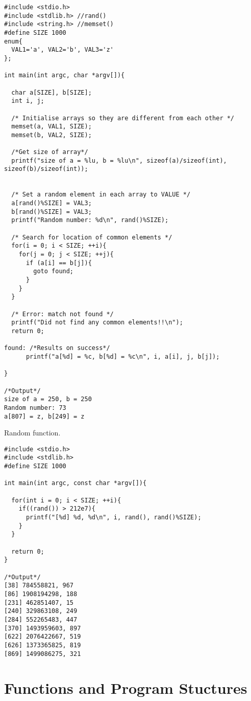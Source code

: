 \documentclass[10pt, a4paper, twocolumn]{article} %
\begin{document}
\begin{lstlisting}
#include <stdio.h>
#include <stdlib.h> //rand()
#include <string.h> //memset()
#define SIZE 1000
enum{
  VAL1='a', VAL2='b', VAL3='z'
};

int main(int argc, char *argv[]){

  char a[SIZE], b[SIZE];
  int i, j;

  /* Initialise arrays so they are different from each other */
  memset(a, VAL1, SIZE);
  memset(b, VAL2, SIZE);

  /*Get size of array*/
  printf("size of a = %lu, b = %lu\n", sizeof(a)/sizeof(int), sizeof(b)/sizeof(int));


  /* Set a random element in each array to VALUE */
  a[rand()%SIZE] = VAL3;
  b[rand()%SIZE] = VAL3;
  printf("Random number: %d\n", rand()%SIZE);

  /* Search for location of common elements */
  for(i = 0; i < SIZE; ++i){
    for(j = 0; j < SIZE; ++j){
      if (a[i] == b[j]){
        goto found;
      }
    }
  }

  /* Error: match not found */
  printf("Did not find any common elements!!\n");
  return 0;

found: /*Results on success*/
      printf("a[%d] = %c, b[%d] = %c\n", i, a[i], j, b[j]);

}

/*Output*/
size of a = 250, b = 250
Random number: 73
a[807] = z, b[249] = z
\end{lstlisting}

Random function.

\begin{lstlisting}
#include <stdio.h>
#include <stdlib.h>
#define SIZE 1000

int main(int argc, const char *argv[]){

  for(int i = 0; i < SIZE; ++i){
    if((rand()) > 212e7){
      printf("[%d] %d, %d\n", i, rand(), rand()%SIZE);
    }
  }

  return 0;
}

/*Output*/
[38] 784558821, 967
[86] 1908194298, 188
[231] 462851407, 15
[240] 329863108, 249
[284] 552265483, 447
[370] 1493959603, 897
[622] 2076422667, 519
[626] 1373365825, 819
[869] 1499086275, 321
\end{lstlisting}


\section{Functions and Program Stuctures}
\end{document}
